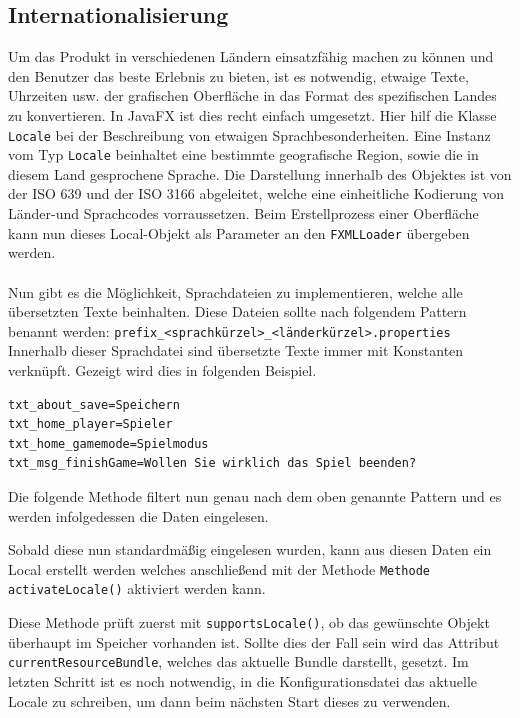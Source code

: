 \subsection{Internationalisierung}\label{sssec:internationalization}
Um das Produkt in verschiedenen Ländern einsatzfähig machen zu können und den Benutzer das beste Erlebnis zu bieten, ist es notwendig, etwaige Texte, Uhrzeiten usw. der grafischen Oberfläche in das Format des spezifischen Landes zu konvertieren.
In JavaFX ist dies recht einfach umgesetzt.
Hier hilf die Klasse \lstinline[style=java]{Locale} bei der Beschreibung von etwaigen Sprachbesonderheiten.
Eine Instanz vom Typ \lstinline[style=java]{Locale} beinhaltet eine bestimmte geografische Region, sowie die in diesem Land gesprochene Sprache.
Die Darstellung innerhalb des Objektes ist von der ISO 639 und der ISO 3166 abgeleitet, welche eine einheitliche Kodierung von Länder-und Sprachcodes vorraussetzen.
Beim Erstellprozess einer Oberfläche kann nun dieses Local-Objekt als Parameter an den \lstinline[style=java]{FXMLLoader} übergeben werden.\\\\
Nun gibt es die Möglichkeit, Sprachdateien zu implementieren, welche alle übersetzten Texte beinhalten.
Diese Dateien sollte nach folgendem Pattern benannt werden: \lstinline[style=java]{prefix_<sprachkürzel>_<länderkürzel>.properties}\\
Innerhalb dieser Sprachdatei sind übersetzte Texte immer mit Konstanten verknüpft.
Gezeigt wird dies in folgenden Beispiel.
\begin{lstlisting}[style=java,caption=Beispielbundle,label=resource]
txt_about_save=Speichern
txt_home_player=Spieler
txt_home_gamemode=Spielmodus
txt_msg_finishGame=Wollen Sie wirklich das Spiel beenden?
\end{lstlisting}
Die folgende Methode filtert nun genau nach dem oben genannte Pattern und es werden infolgedessen die Daten eingelesen.

Sobald diese nun standardmäßig eingelesen wurden, kann aus diesen Daten ein Local erstellt werden welches anschließend mit der Methode \lstinline[style=java]{Methode activateLocale()} aktiviert werden kann.

Diese Methode prüft zuerst mit \lstinline[style=java]{supportsLocale()}, ob das gewünschte Objekt überhaupt im Speicher vorhanden ist.
Sollte dies der Fall sein wird das Attribut \lstinline[style=java]{currentResourceBundle}, welches das aktuelle Bundle darstellt, gesetzt.
Im letzten Schritt ist es noch notwendig, in die Konfigurationsdatei das aktuelle Locale zu schreiben, um dann beim nächsten Start dieses zu verwenden.
\newpage
